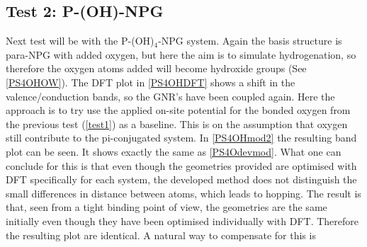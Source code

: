 \subsection{Test 2: P-(OH)-NPG}\label{test2}
Next test will be with the P-(OH)\(_4\)-NPG system. Again the basis structure is para-NPG with added oxygen, but here the aim is to simulate hydrogenation, so therefore the oxygen atoms added will become hydroxide groups (See \cref{PS4OHOW}). The DFT plot in \cref{PS4OHDFT} shows a shift in the valence/conduction bands, so the GNR's have been coupled again. Here the approach is to try use the applied on-site potential for the bonded oxygen from the previous test (\cref{test1}) as a baseline. This is on the assumption that oxygen still contribute to the pi-conjugated system. In \cref{PS4OHmod2} the resulting band plot can be seen. It shows exactly the same as \cref{PS4Odevmod}. What one can conclude for this is that even though the geometries provided are optimised with DFT specifically for each system, the developed method does not distinguish the small differences in distance between atoms, which leads to hopping. The result is that, seen from a tight binding point of view, the geometries are the same initially even though they have been optimised individually with DFT. Therefore the resulting plot are identical. A natural way to compensate for this is 
